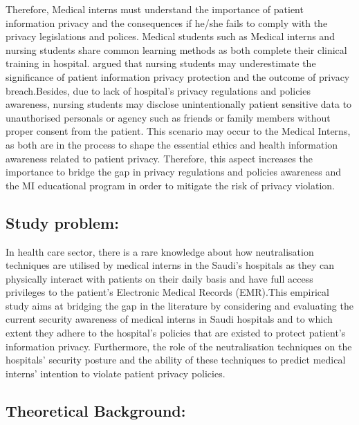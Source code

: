 Therefore, Medical interns must understand the importance of patient information privacy and the consequences if he/she fails to comply with the privacy legislations and polices. Medical students such as Medical interns and nursing students share common learning methods as both complete their clinical training in hospital.\cite{Park2017} argued that nursing students may underestimate the significance of patient information privacy protection and the outcome of privacy breach.Besides, due to lack of hospital's privacy regulations and policies awareness, nursing students may disclose unintentionally patient sensitive data to unauthorised personals or agency such as friends or family members without proper consent from the patient. This scenario may occur to the Medical Interns, as both are in the process to shape the essential ethics and health information awareness related to patient privacy. Therefore, this aspect increases the importance to bridge the gap in privacy regulations and policies awareness and the MI educational program in order to mitigate the risk of privacy violation. 

 \subsection{Study problem:}
In health care sector, there is a rare knowledge about how neutralisation techniques are utilised by medical interns in the Saudi's hospitals as they can physically interact with patients on their daily basis and have full access privileges to the patient's Electronic Medical Records (EMR).This empirical study aims at bridging the gap in the literature by considering and evaluating the current security awareness of medical interns in Saudi hospitals and to which extent they adhere to the hospital’s policies that are existed to protect patient’s information privacy. Furthermore, the role of the neutralisation techniques on the hospitals’ security posture and the ability of these techniques to predict medical interns’ intention to violate patient privacy policies.
\subsection{Theoretical Background:}
